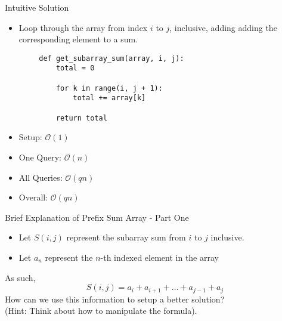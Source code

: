 \documentclass{beamer}
\begin{document}
\begin{frame}[fragile]{Intuitive Solution}
    \begin{itemize}
        \item Loop through the array from index $i$ to $j$, inclusive, adding adding the corresponding element to a sum.
    \end{itemize}

    \begin{lstlisting}
        def get_subarray_sum(array, i, j):
            total = 0
            
            for k in range(i, j + 1):
                total += array[k]
            
            return total
    \end{lstlisting}
    
    \begin{itemize}
        \item Setup: $\mathcal{O}(1)$
        \item One Query: $\mathcal{O}(n)$
        \item All Queries: $\mathcal{O}(qn)$
        \item Overall: $\mathcal{O}(qn)$
    \end{itemize}
\end{frame}

\begin{frame}{Brief Explanation of Prefix Sum Array - Part One}
    \begin{itemize}
        \item Let $S(i, j)$ represent the subarray sum from $i$ to $j$ inclusive. \\
        \item Let $a_n$ represent the $n$-th indexed element in the array
    \end{itemize}
    
    As such, 
    \begin{equation*}
        S(i, j) = a_{i} + a_{i + 1} + \dots + a_{j - 1} + a_{j}
    \end{equation*}
    How can we use this information to setup a better solution? \\
    
    (Hint: Think about how to manipulate the formula).
\end{frame}
\end{document}
